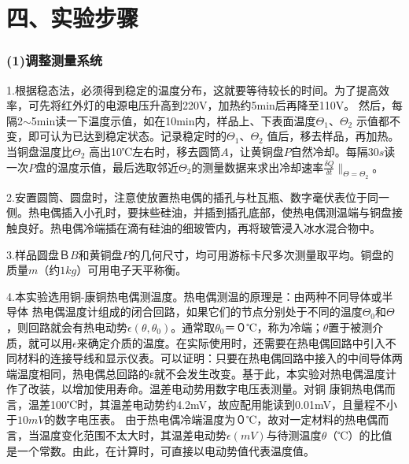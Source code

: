 \documentclass[11pt,a4paper,oneside]{article}
\begin{document}
\section*{四、实验步骤}

\subsubsection*{(1)调整测量系统}

1.根据稳态法，必须得到稳定的温度分布，这就要等待较长的时间。为了提高效率，可先将红外灯的电源电压升高到220V，加热约5min后再降至110V。
然后，每隔2${\sim}$5min读一下温度示值，如在10min内，样品上、下表面温度${\Theta}_1$、${\Theta}_2$ 示值都不变，即可认为已达到稳定状态。记录稳定时的${\Theta} _1$、${\Theta}_2$ 值后，移去样品，再加热。当铜盘温度比${\Theta}_2$ 高出10℃左右时，移去圆筒$A$，让黄铜盘$P$自然冷却。每隔$30s$读一次$P$盘的温度示值，最后选取邻近$\Theta _2$的测量数据来求出冷却速率$\displaystyle\frac{\delta Q}{\delta t}\|_{{\Theta} ={\Theta _2}}$。

2.安置圆筒、圆盘时，注意使放置热电偶的插孔与杜瓦瓶、数字毫伏表位于同一侧。热电偶插入小孔时，要抹些硅油，并插到插孔底部，使热电偶测温端与铜盘接触良好。热电偶冷端插在滴有硅油的细玻管内，再将玻管浸入冰水混合物中。

3.样品圆盘Ｂ$B$和黄铜盘$P$的几何尺寸，均可用游标卡尺多次测量取平均。铜盘的质量$m$（约$1kg$）可用电子天平称衡。

4.本实验选用铜-康铜热电偶测温度。热电偶测温的原理是：由两种不同导体或半导体 热电偶温度计组成的闭合回路，如果它们的节点分别处于不同的温度$\Theta _0$和$\Theta $，则回路就会有热电动势$\epsilon (\theta ,\theta _0)$。通常取$\theta _0$＝０℃，称为冷端；$\theta $置于被测介质，就可以用$\epsilon$来确定介质的温度。在实际使用时，还需要在热电偶回路中引入不同材料的连接导线和显示仪表。可以证明：只要在热电偶回路中接入的中间导体两端温度相同，热电偶总回路的ε就不会发生改变。基于此，本实验对热电偶温度计作了改装，以增加使用寿命。温差电动势用数字电压表测量。对铜 康铜热电偶而言，温差100℃时，其温差电动势约4.2mV，故应配用能读到0.01mV，且量程不小于$10mV$的数字电压表。
由于热电偶冷端温度为０℃，故对一定材料的热电偶而言，当温度变化范围不太大时，其温差电动势${\epsilon}(mV)$与待测温度${\theta}$（℃）的比值是一个常数。由此，在计算时，可直接以电动势值代表温度值。
\end{document}
